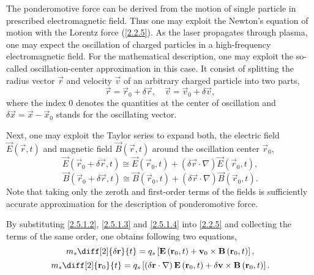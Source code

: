 The ponderomotive force can be derived from the motion of single particle in prescribed electromagnetic field. Thus one may exploit the Newton's equation of motion with the Lorentz force (\ref{2.2.5}). As the laser propagates through plasma, one may expect the oscillation of charged particles in a high-frequency electromagnetic field. For the mathematical description, one may exploit the so-called oscillation-center approximation in this case. It consist of splitting the radius vector $ \vec{r} $ and velocity $ \vec{v} $ of an arbitrary charged particle into two parts,
\begin{equation}
\label{2.5.1.2}
\vec{r} = \vec{r}_0 + \delta \vec{r}, \quad \vec{v} = \vec{v}_0 + \delta \vec{v},
\end{equation}
where the index $ 0 $ denotes the quantities at the center of oscillation and $ \delta \vec{x} = \vec{x} - \vec{x}_0 $ stands for the oscillating vector.

Next, one may exploit the Taylor series to  expand both, the electric field $ \vec{E}\left(\vec{r}, t\right) $ and magnetic field $ \vec{B}\left(\vec{r}, t\right) $ around the oscillation center $ \vec{r}_0 $,
\begin{equation}
\label{2.5.1.3}
\vec{E}\left(\vec{r}_0 + \delta \vec{r}, t\right) \cong \vec{E}\left(\vec{r}_0, t\right) + \left(\delta \vec{r} \cdot \nabla \right) \vec{E}\left(\vec{r}_0, t\right),
\end{equation}
\begin{equation}
\label{2.5.1.4}
\vec{B}\left(\vec{r}_0 + \delta \vec{r}, t\right) \cong \vec{B}\left(\vec{r}_0, t\right) + \left(\delta \vec{r} \cdot \nabla \right) \vec{B}\left(\vec{r}_0, t\right).
\end{equation}
Note that taking only the zeroth and first-order terms of the fields is sufficiently accurate approximation for the description of ponderomotive force.

By substituting \ref{2.5.1.2}, \ref{2.5.1.3} and \ref{2.5.1.4} into \ref{2.2.5} and collecting the terms of the same order, one obtains following two equations, 
\begin{equation}
\label{2.5.1.5}
m_s \diff[2]{\delta \vec{r}}{t} = q_s \left[ \vec{E}\left(\vec{r}_0, t\right) + \vec{v}_0 \times \vec{B}\left(\vec{r}_0, t\right)\right],
\end{equation}
\begin{equation}
\label{2.5.1.6}
m_s \diff[2]{\vec{r}_0}{t} = q_s \left[\left(\delta \vec{r} \cdot \nabla \right) \vec{E}\left(\vec{r}_0, t\right) + \delta \vec{v} \times \vec{B}\left(\vec{r}_0, t\right) \right]. 
\end{equation}

